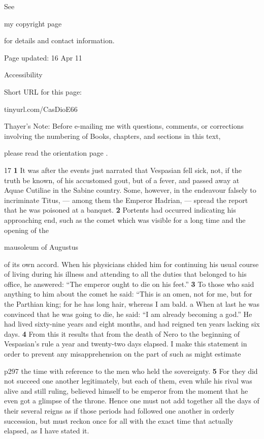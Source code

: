 See

my copyright page

for details and contact information.

Page updated:
16 Apr 11

Accessibility


Short URL for this page:

tinyurl.com/CasDioE66

Thayer's Note: Before e-mailing me with questions, comments, or corrections involving the numbering of Books, chapters, and sections in this text,

please read the orientation page .

17
\textbf{1} It was after the events just narrated that Vespasian fell sick, not, if the truth be known, of his accustomed gout, but of a fever, and passed away at Aquae Cutiliae in the Sabine country. Some, however, in the endeavour falsely to incriminate Titus, \texthebrew{—} among them the Emperor Hadrian, \texthebrew{—} spread the report that he was poisoned at a banquet. \textbf{2} Portents had occurred indicating his approaching end, such as the comet which was visible for a long time and the opening of the

mausoleum of Augustus

of its own accord. When his physicians chided him for continuing his usual course of living during his illness and attending to all the duties that belonged to his office, he answered: ``The emperor ought to die on his feet.'' \textbf{3} To those who said anything to him about the comet he said: ``This is an omen, not for me, but for the Parthian king; for he has long hair, whereas I am bald.\texthebrew{⁠} a When at last he was convinced that he was going to die, he said: ``I am already becoming a god.'' He had lived sixty-nine years and eight months, and had reigned ten years lacking six days. \textbf{4} From this it results that from the death of Nero to the beginning of Vespasian's rule a year and twenty-two days elapsed. I make this statement in order to prevent any misapprehension on the part of such as might estimate

p297 the time with reference to the men who held the sovereignty. \textbf{5} For they did not succeed one another legitimately, but each of them, even while his rival was alive and still ruling, believed himself to be emperor from the moment that he even got a glimpse of the throne. Hence one must not add together all the days of their several reigns as if those periods had followed one another in orderly succession, but must reckon once for all with the exact time that actually elapsed, as I have stated it.

